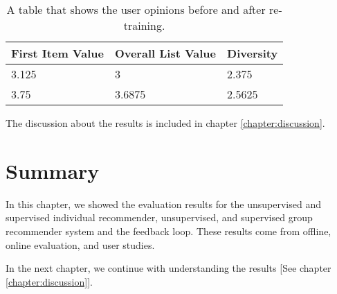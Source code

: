 \begin{table}[htp]
	\caption[Online Evaluation Table]{A table that shows the user opinions before and after re-training.}\label{tab:online-evaluation}
	\centering
	\begin{tabular}{l l l}
		\toprule
		First Item Value & Overall List Value & Diversity \\
		\midrule
		3.125 & 3 & 2.375\\
		3.75 & 3.6875 & 2.5625 \\
		\bottomrule
	\end{tabular}
\end{table}

The discussion about the results is included in chapter \ref{chapter:discussion}.

\section{Summary}

In this chapter, we showed the evaluation results for the unsupervised and supervised individual recommender, unsupervised, and supervised group recommender system and the feedback loop. These results come from offline, online evaluation, and user studies. 

In the next chapter, we continue with understanding the results [See chapter \ref{chapter:discussion}].


